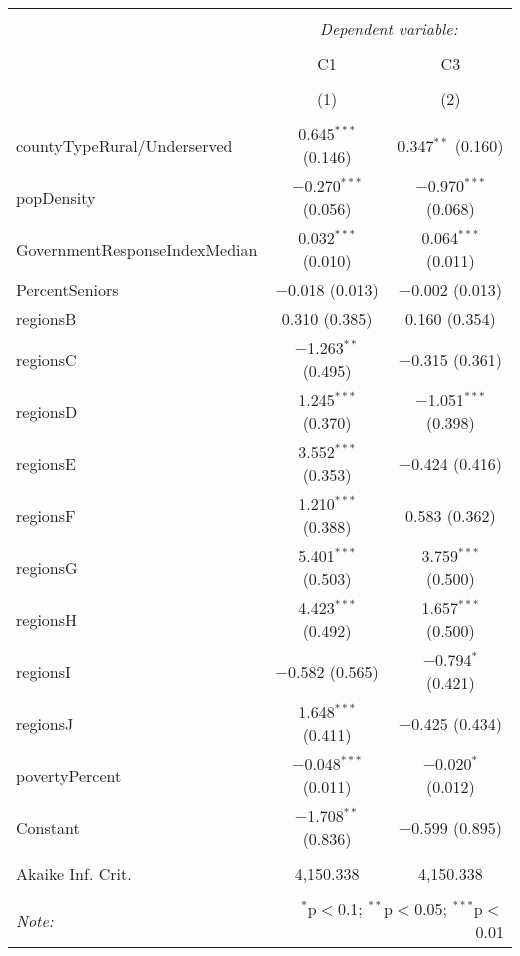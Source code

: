 
\begin{table}[!htbp] \centering 
  \caption{} 
  \label{} 
\begin{tabular}{@{\extracolsep{5pt}}lcc} 
\\[-1.8ex]\hline 
\hline \\[-1.8ex] 
 & \multicolumn{2}{c}{\textit{Dependent variable:}} \\ 
\cline{2-3} 
\\[-1.8ex] & C1 & C3 \\ 
\\[-1.8ex] & (1) & (2)\\ 
\hline \\[-1.8ex] 
 countyTypeRural/Underserved & 0.645$^{***}$ (0.146) & 0.347$^{**}$ (0.160) \\ 
  popDensity & $-$0.270$^{***}$ (0.056) & $-$0.970$^{***}$ (0.068) \\ 
  GovernmentResponseIndexMedian & 0.032$^{***}$ (0.010) & 0.064$^{***}$ (0.011) \\ 
  PercentSeniors & $-$0.018 (0.013) & $-$0.002 (0.013) \\ 
  regionsB & 0.310 (0.385) & 0.160 (0.354) \\ 
  regionsC & $-$1.263$^{**}$ (0.495) & $-$0.315 (0.361) \\ 
  regionsD & 1.245$^{***}$ (0.370) & $-$1.051$^{***}$ (0.398) \\ 
  regionsE & 3.552$^{***}$ (0.353) & $-$0.424 (0.416) \\ 
  regionsF & 1.210$^{***}$ (0.388) & 0.583 (0.362) \\ 
  regionsG & 5.401$^{***}$ (0.503) & 3.759$^{***}$ (0.500) \\ 
  regionsH & 4.423$^{***}$ (0.492) & 1.657$^{***}$ (0.500) \\ 
  regionsI & $-$0.582 (0.565) & $-$0.794$^{*}$ (0.421) \\ 
  regionsJ & 1.648$^{***}$ (0.411) & $-$0.425 (0.434) \\ 
  povertyPercent & $-$0.048$^{***}$ (0.011) & $-$0.020$^{*}$ (0.012) \\ 
  Constant & $-$1.708$^{**}$ (0.836) & $-$0.599 (0.895) \\ 
 \hline \\[-1.8ex] 
Akaike Inf. Crit. & 4,150.338 & 4,150.338 \\ 
\hline 
\hline \\[-1.8ex] 
\textit{Note:}  & \multicolumn{2}{r}{$^{*}$p$<$0.1; $^{**}$p$<$0.05; $^{***}$p$<$0.01} \\ 
\end{tabular} 
\end{table} 
